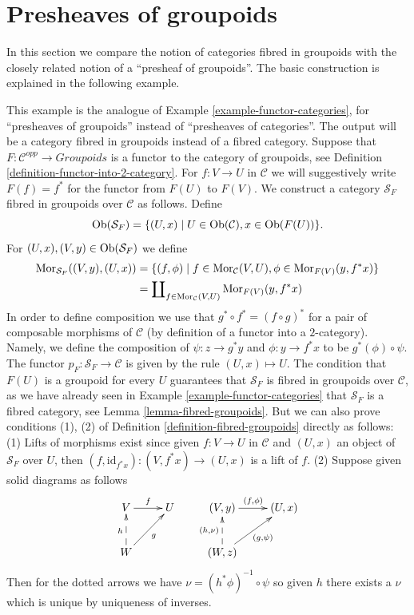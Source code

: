 \section{Presheaves of groupoids}
\label{section-presheaves-groupoids}

\noindent
In this section we compare the notion of categories fibred in groupoids
with the closely related notion of a ``presheaf of groupoids''. The basic
construction is explained in the following example.

\begin{example}
\label{example-functor-groupoids}
This example is the analogue of
Example \ref{example-functor-categories},
for ``presheaves of groupoids'' instead of ``presheaves of categories''.
The output will be a category fibred in groupoids instead of a fibred category.
Suppose that $F : \mathcal{C}^{opp} \to \textit{Groupoids}$ is a functor
to the category of groupoids, see
Definition \ref{definition-functor-into-2-category}.
For $f : V \to U$ in $\mathcal{C}$ we will
suggestively write $F(f) = f^\ast$ for the functor from $F(U)$ to $F(V)$.
We construct a category $\mathcal{S}_F$ fibred in groupoids over $\mathcal{C}$
as follows. Define
$$
\mathop{\mathrm{Ob}}\nolimits(\mathcal{S}_F) =
\{(U, x) \mid U\in \mathop{\mathrm{Ob}}\nolimits(\mathcal{C}), x\in \mathop{\mathrm{Ob}}\nolimits(F(U))\}.
$$
For $(U, x), (V, y) \in \mathop{\mathrm{Ob}}\nolimits(\mathcal{S}_F)$ we define
\begin{align*}
\mathop{\mathrm{Mor}}\nolimits_{\mathcal{S}_F}((V, y), (U, x))
& =
\{ (f, \phi) \mid f \in \mathop{\mathrm{Mor}}\nolimits_\mathcal{C}(V, U),
\phi \in \mathop{\mathrm{Mor}}\nolimits_{F(V)}(y, f^\ast x)\} \\
& =
\coprod\nolimits_{f \in \mathop{\mathrm{Mor}}\nolimits_\mathcal{C}(V, U)}
\mathop{\mathrm{Mor}}\nolimits_{F(V)}(y, f^\ast x)
\end{align*}
In order to define composition we use that $g^\ast \circ f^\ast =
(f \circ g)^\ast$ for a pair of composable morphisms of $\mathcal{C}$
(by definition of a functor into a $2$-category).
Namely, we define the composition of $\psi : z \to g^\ast y$ and
$ \phi : y \to f^\ast x$ to be $ g^\ast(\phi) \circ \psi$. The functor
$p_F : \mathcal{S}_F \to \mathcal{C}$ is given by the rule $(U, x) \mapsto U$.
The condition that $F(U)$ is a groupoid for every $U$ guarantees that
$\mathcal{S}_F$ is fibred in groupoids over $\mathcal{C}$, as we have
already seen in
Example \ref{example-functor-categories}
that $\mathcal{S}_F$ is a fibred category, see
Lemma \ref{lemma-fibred-groupoids}.
But we can also prove conditions (1), (2) of
Definition \ref{definition-fibred-groupoids}
directly as follows: (1) Lifts of
morphisms exist since given $f: V \to U$ in $\mathcal{C}$ and $(U, x)$
an object of $\mathcal{S}_F$ over $U$, then
$(f, \text{id}_{f^\ast x}): (V, {f^\ast x}) \to (U, x)$ is a lift of $f$.
(2) Suppose given solid diagrams as follows
$$
\xymatrix{
V \ar[r]^f & U & (V, y) \ar[r]^{(f, \phi)} & (U, x) \\
W \ar@{-->}[u]^h \ar[ru]_g & &
(W, z) \ar@{-->}[u]^{(h, \nu)} \ar[ru]_{(g, \psi)} & \\
}
$$
Then for the dotted arrows we have $\nu = (h^\ast \phi)^{-1} \circ \psi$
so given $h$ there exists a $\nu$ which is unique by uniqueness of inverses.
\end{example}

